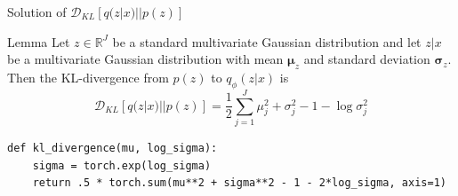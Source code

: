 \documentclass{beamer}
\newcommand{\real}{\mathbb{R}}
\newcommand{\kldiv}{\mathcal{D}_{KL}}
\begin{document}
\begin{frame}[fragile]{Solution of $\kldiv[q(z|x)||p(z)]$}
	\begin{block}{Lemma}
		Let $z\in \real^J$ be a standard multivariate Gaussian distribution and let $z|x$ be a multivariate Gaussian distribution with mean $\bm{\mu}_z$ and standard deviation $\bm{\sigma}_z$. Then the KL-divergence from $p(z)$ to $q_\phi(z|x)$ is 
		\begin{equation*}
		\kldiv[q(z|x)||p(z)] 
		= \frac{1}{2}\sum_{j=1}^J \mu_j^2 + \sigma_j^2 - 1 - \log \sigma_j^2
		\end{equation*}
	\end{block}
\begin{verbatim}
def kl_divergence(mu, log_sigma):
    sigma = torch.exp(log_sigma)
    return .5 * torch.sum(mu**2 + sigma**2 - 1 - 2*log_sigma, axis=1)
\end{verbatim}
\end{frame}
\end{document}
